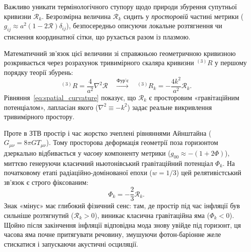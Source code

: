 \begin{keybox}[title={Геометричний зв'язок Простору і Часу}]
Важливо уникати термінологічного ступору щодо природи збурення супутньої кривизни $\mathcal{R}_k$. Безрозмірна величина $\mathcal{R}_k$ сидить у \emph{просторовій} частині метрики ($g_{ij} \approx a^2(1-2\mathcal{R})\delta_{ij}$), безпосередньо описуючи локальне розтягнення чи стиснення координатної сітки, що рухається разом із плазмою.

Математичний зв'язок цієї величини зі справжньою геометричною кривизною розкривається через розрахунок тривимірного скаляра кривизни $^{(3)}R$ у першому порядку теорії збурень:
\begin{equation}\label{eq:spatial_curvature}
  ^{(3)}R = \frac{4}{a^2} \nabla^2 \mathcal{R}
  \quad\xrightarrow{\text{Фур'є}}\quad
  ^{(3)}R_k = -\frac{4k^2}{a^2} \mathcal{R}_k.
\end{equation}
Рівняння~\eqref{eq:spatial_curvature} показує, що $\mathcal{R}_k$ є просторовим «гравітаційним потенціалом», лапласіан якого ($\nabla^2 \equiv -k^2$) задає реальне викривлення тривимірного простору.

Проте в ЗТВ простір і час жорстко зчеплені рівняннями Айнштайна ($G_{\mu\nu} = 8\pi G T_{\mu\nu}$). Тому просторова деформація геометрії поза горизонтом дзеркально відбивається у \emph{часову} компоненту метрики ($g_{00} \approx -(1+2\Phi)$), миттєво генеруючи класичний ньютонівський гравітаційний потенціал $\Phi_k$. На початковому етапі радіаційно-домінованої епохи ($w=1/3$) цей релятивістський зв'язок є строго фіксованим:
\begin{equation}\label{eq:R_to_Phi}
  \Phi_k = -\frac{2}{3}\mathcal{R}_k.
\end{equation}
Знак «мінус» має глибокий фізичний сенс: там, де простір під час інфляції був сильніше розтягнутий ($\mathcal{R}_k > 0$), виникає класична гравітаційна яма ($\Phi_k < 0$). Щойно після закінчення інфляції відповідна мода знову увійде під горизонт, ця часова яма почне притягувати речовину, змушуючи фотон-баріонне желе стискатися і запускаючи акустичні осциляції.
\end{keybox}

